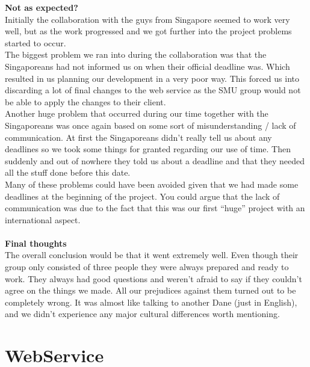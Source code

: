 \documentclass[10pt,a4paper]{article}
\begin{document}
{\bfseries Not as expected?}\\
Initially the collaboration with the guys from Singapore seemed to work very well, but as the work progressed and we got further into the project problems started to occur. \\
The biggest problem we ran into during the collaboration was that the Singaporeans had not informed us on when their official deadline was. Which resulted in us planning our development in a very poor way. This forced us into discarding a lot of final changes to the web service as the SMU group would not be able to apply the changes to their client. \\
Another huge problem that occurred during our time together with the Singaporeans was once again based on some sort of misunderstanding / lack of communication. At first the Singaporeans didn’t really tell us about any deadlines so we took some things for granted regarding our use of time. Then suddenly and out of nowhere they told us about a deadline and that they needed all the stuff done before this date. \\
Many of these problems could have been avoided given that we had made some deadlines at the beginning of the project. You could argue that the lack of communication was due to the fact that this was our first “huge” project with an international aspect.\\\\
{\bfseries Final thoughts}\\
The overall conclusion would be that it went extremely well. Even though their group only consisted of three people they were always prepared and ready to work. They always had good questions and weren’t afraid to say if they couldn’t agree on the things we made. All our prejudices against them turned out to be completely wrong. It was almost like talking to another Dane (just in English), and we didn’t experience any major cultural differences worth mentioning.






\section{WebService}
\end{document}
